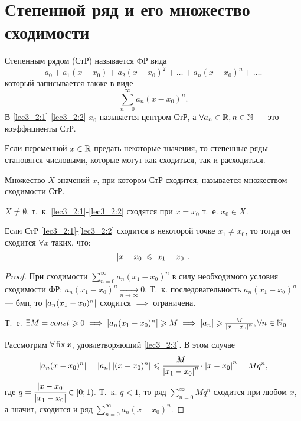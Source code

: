 \documentclass[../../main.tex]{subfiles}
\begin{document}
\section{Степенной ряд и его множество сходимости}

Степенным рядом (СтР) называется ФР вида
\begin{equation}\label{lec3_2:1}
a_0+a_1(x-x_0)+a_2(x-x_0)^2+\dots+a_n(x-x_0)^n+\dots.
\end{equation}
который записывается также в виде
\begin{equation}\label{lec3_2:2}
\sum_{n=0}^{\infty}a_n(x-x_0)^n.
\end{equation}
В \eqref{lec3_2:1}-\eqref{lec3_2:2} $x_0$ называется центром СтР, 
а $\forall a_n \in \mathbb{R}, n\in \mathbb{N}$ --- это коэффициенты СтР.

Если переменной $x\in\mathbb{R}$ предать некоторые значения, 
то степенные ряды становятся числовыми, которые могут как сходиться, 
так и расходиться.

Множество $X$ значений $x$, при котором СтР сходится, 
называется множеством сходимости СтР. 

$X \neq \emptyset$, т.~к. \eqref{lec3_2:1}-\eqref{lec3_2:2} 
сходятся при $x=x_0$ т.~е. $x_0\in X$.

\begin{lem}
	Если СтР \eqref{lec3_2:1}-\eqref{lec3_2:2} сходится в некоторой 
	точке $x_1\neq x_0$, то тогда он сходится $\forall x$ таких, что:
	\begin{equation}\label{lec3_2:3}
		 \left|{ x - x_0}\right| \leqslant \left|{x_1 - x_0}\right|.
	\end{equation}
\end{lem}
\begin{proof}
	При сходимости $\sum_{n=0}^{\infty}a_n(x_1-x_0)^n$ в силу необходимого
	 условия сходимости ФР: $a_n(x_1-x_0)^n\underset{n\to\infty}{\rightarrow}0$. 
	Т.~к. последовательность $a_n(x_1-x_0)^n$ --- бмп, 
	то $\left|{a_n(x_1-x_0)^n}\right|$ сходится $\implies$ ограничена.
	
	Т.~е. $\exists M=const \geqslant0 \implies \left|{a_n(x_1-x_0)^n}\right| \geqslant M
	\implies \left|{a_n}\right|\geqslant \frac{M}{\left|{x_1-x_0}\right|^n}, \forall n\in\mathbb{N}_0$
	
	Рассмотрим $\forall \operatorname{fix} x $, удовлетворяющий \eqref{lec3_2:3}. 
	В этом случае  
	\begin{equation*}
		\left|{a_n(x-x_0)^n}\right| = \left|{a_n}\right|\left|{(x-x_0)^n}\right|\leqslant 
		\cfrac{M}{\left|{x_1-x_0}\right|^n}\cdot \left|{x-x_0}\right|^n=Mq^n,
	\end{equation*}
	где $q=\cfrac{\left|{x-x_0}\right|}{\left|{x_1-x_0}\right|}\in{\left[0;1\right)}.$ Т.~к. $q < 
	1$, то ряд $\sum_{n=0}^{\infty} Mq^n$ сходится при любом $x$, а значит, 
	сходится и ряд $\sum_{n=0}^{\infty} a_n(x-x_0)^n$.
\end{proof}	
\end{document}
